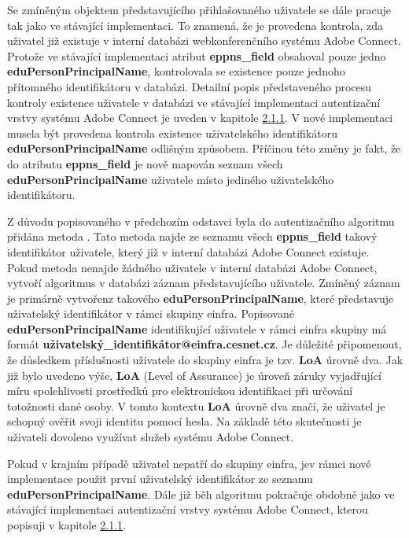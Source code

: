 \documentclass[
  printed, %
  twoside, %
  table,   %
  nolof,     %
  nolot,     %
]{fithesis3}
\begin{document}
Se zmíněným objektem představujícího přihlašovaného uživatele se dále pracuje tak jako ve stávající implementaci. To znamená, že je provedena kontrola, zda uživatel již existuje v interní databázi webkonferenčního systému Adobe Connect. Protože ve stávající implementaci atribut \textbf{eppns\_field} obsahoval pouze jedno \textbf{eduPersonPrincipalName}, kontrolovala se existence pouze jednoho přítomného identifikátoru v databázi. Detailní popis představeného procesu kontroly existence uživatele v databázi ve stávající implementaci autentizační vrstvy systému Adobe Connect je uveden v kapitole \hyperref[ac-old]{2.1.1}. V nové implementaci musela být provedena kontrola existence uživatelského identifikátoru \textbf{eduPersonPrincipalName} odlišným způsobem. Příčinou této změny je fakt, že do atributu \textbf{eppns\_field} je nově mapován seznam všech \textbf{eduPersonPrincipalName} uživatele místo jediného uživatelského identifikátoru.
\par
Z důvodu popisovaného v předchozím odstavci byla do autentizačního algoritmu přidána metoda . Tato metoda najde ze seznamu všech \textbf{eppns\_field} takový identifikátor uživatele, který již v interní databázi Adobe Connect existuje. Pokud metoda  nenajde žádného uživatele v interní databázi Adobe Connect, vytvoří algoritmus v databázi záznam představujícího uživatele. Zmíněný záznam je primárně vytvořen\break z takového \textbf{eduPersonPrincipalName}, které představuje uživatelský identifikátor v rámci skupiny einfra. Popisované \textbf{eduPersonPrincipalName} identifikující uživatele v rámci einfra skupiny má formát \textbf{{uživatelský\_identifikátor}@einfra.cesnet.cz}. Je důležité připomenout, že důsledkem příslušnosti uživatele do skupiny einfra je tzv. \textbf{LoA} úrovně dva. Jak již bylo uvedeno výše, \textbf{LoA} (Level of Assurance) \cite{rfc6711} je úroveň záruky vyjadřující míru spolehlivosti prostředků pro
elektronickou identifikaci při určování totožnosti dané osoby. V tomto kontextu \textbf{LoA} úrovně dva značí, že uživatel je schopný ověřit svoji identitu pomocí hesla. Na základě této skutečnosti je uživateli dovoleno využívat služeb systému Adobe Connect. 
\par 
Pokud v krajním případě uživatel nepatří do skupiny einfra, je\break v rámci nové implementace použit první uživatelský identifikátor ze seznamu \textbf{eduPersonPrincipalName}. Dále již běh algoritmu pokračuje obdobně jako ve stávající implementaci autentizační vrstvy systému Adobe Connect, kterou popisuji v kapitole \hyperref[ac-old]{2.1.1}. 
\end{document}
